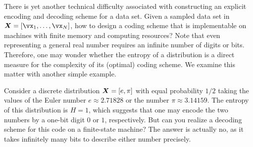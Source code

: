 \documentclass[../../book-main.tex]{subfiles}
\begin{document}




There is yet another technical difficulty associated with constructing an explicit encoding and decoding scheme for a data set. Given a sampled data set in $\X = [\vx_1, \ldots, \vx_N]$, how to design a coding scheme that is implementable on machines with finite memory and computing resources? Note that even representing a general real number requires an infinite number of digits or bits. Therefore, one may wonder whether the entropy of a distribution is a direct measure for the complexity of its (optimal) coding scheme. We examine this matter with another simple example.
\begin{example}[Precision] \label{eg:two-inrational}
	Consider a discrete distribution $\bm{X} = [e, \pi]$ with equal probability $1/2$ taking the values of the Euler number $e \approx 2.71828$ or the number $\pi \approx 3.14159$. The entropy of this distribution is $H =1$, which suggests that one may encode the two numbers by a one-bit digit $0$ or $1$, respectively. But can you realize a decoding scheme for this code on a finite-state machine? The answer is actually no, as it takes infinitely many bits to describe either number precisely.
\end{example}
\end{document}
